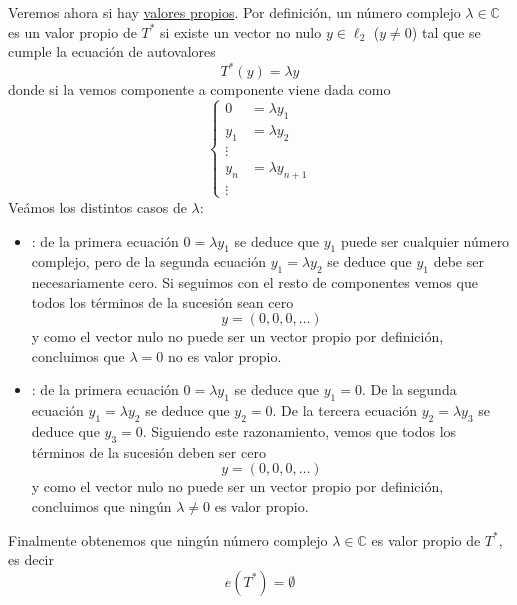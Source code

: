 \begin{ejercicio}
    \noindent
    Veremos ahora si hay \underline{valores propios}. Por definición, un número complejo $\lambda \in \mathbb{C}$ es un valor propio de $T^*$ si existe un vector no nulo $y \in \ell_2$ ($y \neq 0$) tal que se cumple la ecuación de autovalores
    $$T^*(y) = \lambda y$$
    donde si la vemos componente a componente viene dada como
    \begin{equation*}
        \begin{cases}
            0&=\lambda y_1 \\
            y_1&=\lambda y_2 \\
            \vdots \\
            y_n&=\lambda y_{n+1} \\
            \vdots
        \end{cases}
    \end{equation*}
    Veámos los distintos casos de $\lambda$:
    \begin{itemize}
        \item {}: de la primera ecuación $0 = \lambda y_1$ se deduce que $y_1$ puede ser cualquier número complejo, pero de la segunda ecuación $y_1 = \lambda y_2$ se deduce que $y_1$ debe ser necesariamente cero. Si seguimos con el resto de componentes vemos que todos los términos de la sucesión sean cero 
        $$y = (0, 0, 0, \dots)$$ 
        y como el vector nulo no puede ser un vector propio por definición, concluimos que $\lambda = 0$ no es valor propio.
        \item {}: de la primera ecuación $0 = \lambda y_1$ se deduce que $y_1 = 0$. De la segunda ecuación $y_1 = \lambda y_2$ se deduce que $y_2 = 0$. De la tercera ecuación $y_2 = \lambda y_3$ se deduce que $y_3 = 0$. Siguiendo este razonamiento, vemos que todos los términos de la sucesión deben ser cero
        $$y = (0, 0, 0, \dots)$$
        y como el vector nulo no puede ser un vector propio por definición, concluimos que ningún $\lambda \neq 0$ es valor propio.
    \end{itemize}
    Finalmente obtenemos que ningún número complejo $\lambda \in \mathbb{C}$ es valor propio de $T^*$, es decir
    $$e(T^*) = \emptyset$$
\end{ejercicio}


